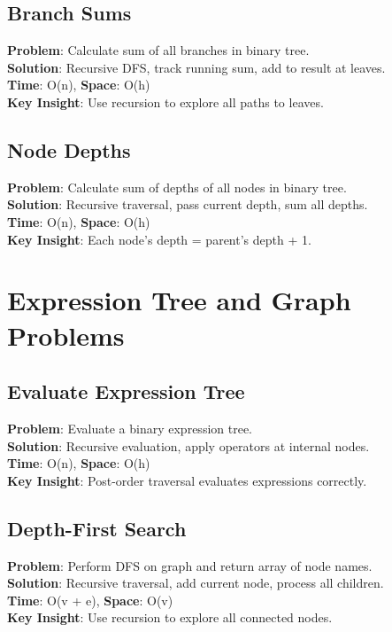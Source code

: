 \documentclass{report}
\begin{document}
\subsection{Branch Sums}
\textbf{Problem}: Calculate sum of all branches in binary tree.\\
\textbf{Solution}: Recursive DFS, track running sum, add to result at leaves.\\
\textbf{Time}: O(n), \textbf{Space}: O(h)\\
\textbf{Key Insight}: Use recursion to explore all paths to leaves.

\subsection{Node Depths}
\textbf{Problem}: Calculate sum of depths of all nodes in binary tree.\\
\textbf{Solution}: Recursive traversal, pass current depth, sum all depths.\\
\textbf{Time}: O(n), \textbf{Space}: O(h)\\
\textbf{Key Insight}: Each node's depth = parent's depth + 1.

\section{Expression Tree and Graph Problems}

\subsection{Evaluate Expression Tree}
\textbf{Problem}: Evaluate a binary expression tree.\\
\textbf{Solution}: Recursive evaluation, apply operators at internal nodes.\\
\textbf{Time}: O(n), \textbf{Space}: O(h)\\
\textbf{Key Insight}: Post-order traversal evaluates expressions correctly.

\subsection{Depth-First Search}
\textbf{Problem}: Perform DFS on graph and return array of node names.\\
\textbf{Solution}: Recursive traversal, add current node, process all children.\\
\textbf{Time}: O(v + e), \textbf{Space}: O(v)\\
\textbf{Key Insight}: Use recursion to explore all connected nodes.
\end{document}
